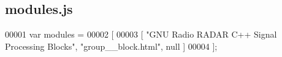 \subsection{modules.\+js}
\label{modules_8js_source}

\begin{DoxyCode}
00001 var modules =
00002 [
00003     [ \textcolor{stringliteral}{"GNU Radio RADAR C++ Signal Processing Blocks"}, \textcolor{stringliteral}{"group\_\_block.html"}, null ]
00004 ];
\end{DoxyCode}
